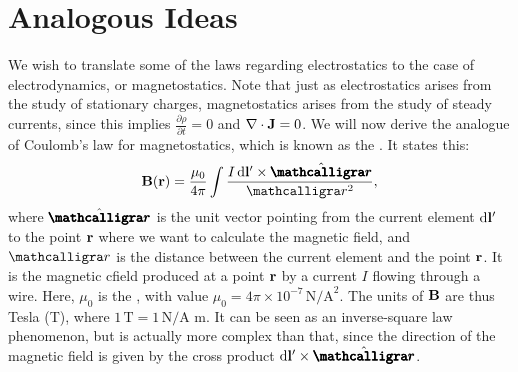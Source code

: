 \section{Analogous Ideas}

We wish to translate some of the laws regarding electrostatics to the case of electrodynamics, or magnetostatics. Note that just as electrostatics arises from the study of stationary charges, magnetostatics arises from the study of steady currents, since this implies $\frac{\partial{\rho}}{\partial{t}} = 0$ and $\nabla \cdot \mathbf{J} = 0$. We will now derive the analogue of Coulomb's law for magnetostatics, which is known as the . It states this:
\begin{align}
    \bv{B}(\bv{r}) = \frac{\mu_{0}}{4 \pi} \int \frac{I \, \di{\bv{l}'} \times \hat{\bcurs{r}}}{\curs{r}^{2}},
\end{align}
where $\hat{\bcurs{r}}$ is the unit vector pointing from the current element $\mathrm{d}\mathbf{l}'$ to the point $\mathbf{r}$ where we want to calculate the magnetic field, and $\curs{r}$ is the distance between the current element and the point $\mathbf{r}$. It is the magnetic cfield produced at a point $\mathbf{r}$ by a current $I$ flowing through a wire. Here, $\mu_{0}$ is the , with value $\mu_{0} = 4 \pi \times 10^{-7} \, \text{N/A}^2$. The units of $\mathbf{B}$ are thus Tesla (T), where $1 \, \text{T} = 1 \, \text{N/A m}$. It can be seen as an inverse-square law phenomenon, but is actually more complex than that, since the direction of the magnetic field is given by the cross product $\di{\bv{l}'} \times \hat{\bcurs{r}}$.
\\

